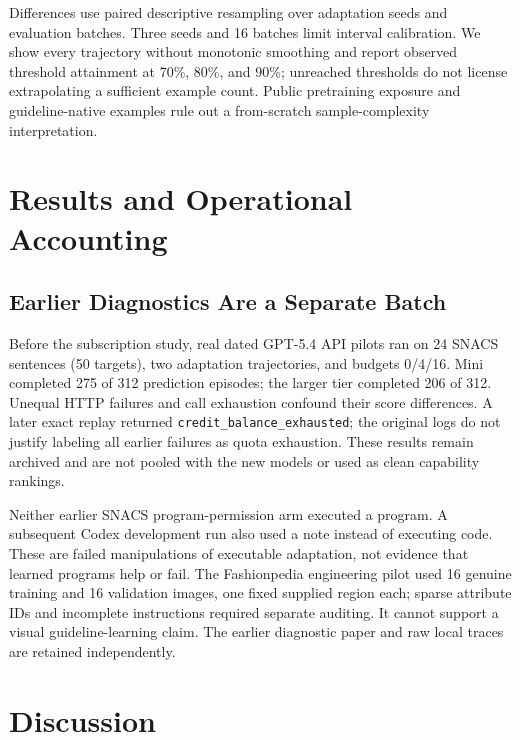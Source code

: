 \documentclass[11pt]{article}
\begin{document}
Differences use paired descriptive resampling over adaptation seeds and evaluation batches. Three seeds and 16 batches limit interval calibration. We show every trajectory without monotonic smoothing and report observed threshold attainment at 70\%, 80\%, and 90\%; unreached thresholds do not license extrapolating a sufficient example count. Public pretraining exposure and guideline-native examples rule out a from-scratch sample-complexity interpretation.

\section{Results and Operational Accounting}


\subsection{Earlier Diagnostics Are a Separate Batch}
Before the subscription study, real dated GPT-5.4 API pilots ran on 24 SNACS sentences (50 targets), two adaptation trajectories, and budgets 0/4/16. Mini completed 275 of 312 prediction episodes; the larger tier completed 206 of 312. Unequal HTTP failures and call exhaustion confound their score differences. A later exact replay returned \texttt{credit\_balance\_exhausted}; the original logs do not justify labeling all earlier failures as quota exhaustion. These results remain archived and are not pooled with the new models or used as clean capability rankings.

Neither earlier SNACS program-permission arm executed a program. A subsequent Codex development run also used a note instead of executing code. These are failed manipulations of executable adaptation, not evidence that learned programs help or fail. The Fashionpedia engineering pilot used 16 genuine training and 16 validation images, one fixed supplied region each; sparse attribute IDs and incomplete instructions required separate auditing. It cannot support a visual guideline-learning claim. The earlier diagnostic paper and raw local traces are retained independently.

\section{Discussion}
\end{document}
